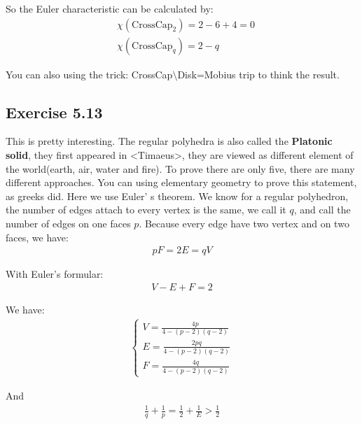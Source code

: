 \documentclass[]{ctexart}
\begin{document}
		So the Euler characteristic can be calculated by:
			\begin{equation*}
			\begin{aligned}
				&\chi(\text{CrossCap}_2)=2-6+4=0\\
				&\chi(\text{CrossCap}_q)=2-q
			\end{aligned}
			\end{equation*}
		
		You can also using the trick: CrossCap$\setminus$Disk=Mobius trip to think the result. 
			
	\subsection{Exercise 5.13}
		This is pretty interesting. The regular polyhedra is also called the \textbf{Platonic solid}, they first appeared in <Timaeus>, they are viewed as different element of the world(earth, air, water and fire). To prove there are only five, there are many different approaches. You can using elementary geometry to prove this statement, as greeks did. Here we use Euler' s theorem. We know for a regular polyhedron, the number of edges attach to every vertex is the same, we call it $q$, and call the number of edges on one faces $p$. Because every edge have two vertex and on two faces, we have:
			\begin{equation*}
			\begin{aligned}
			pF=2E=qV
			\end{aligned}
			\end{equation*}
		
		With Euler's formular:
			\begin{equation*}
			\begin{aligned}
				V-E+F=2
			\end{aligned}
			\end{equation*}
		
		We have:
			\begin{equation*}
			\begin{aligned}
				\begin{cases}
					V=\frac{4p}{4-(p-2)(q-2)}\\
					E=\frac{2pq}{4-(p-2)(q-2)}\\
					F=\frac{4q}{4-(p-2)(q-2)}
				\end{cases}
			\end{aligned}
			\end{equation*}
		
		And
			\begin{equation*}
			\begin{aligned}
				\frac{1}{q}+\frac{1}{p}=\frac{1}{2}+\frac{1}{E}>\frac{1}{2}
			\end{aligned}
			\end{equation*}
		
\end{document}
